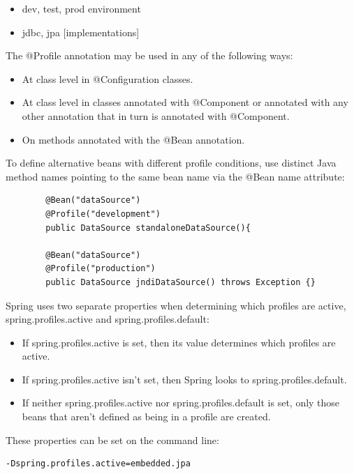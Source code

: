 \documentclass{scrartcl}
\begin{document}
     \begin{itemize}
        \item dev, test, prod environment
        \item jdbc, jpa [implementations]
    \end{itemize}

   The @Profile annotation may be used in any of the following ways:

   \begin{itemize}
       \item At class level in @Configuration classes.
       \item At class level in classes annotated with @Component or annotated with any other annotation that in turn is annotated with @Component.
       \item On methods annotated with the @Bean annotation.
   \end{itemize}

    To define alternative beans with different profile conditions, use distinct Java method names pointing to the same bean name via the @Bean name attribute:

    \begin{lstlisting}
        @Bean("dataSource")
        @Profile("development")
        public DataSource standaloneDataSource(){

        @Bean("dataSource")
        @Profile("production")
        public DataSource jndiDataSource() throws Exception {}

    \end{lstlisting}

   Spring uses two separate properties when determining which profiles are active, spring.profiles.active and spring.profiles.default:

    \begin{itemize}
       \item If spring.profiles.active is set,  then its value determines which profiles are active.
       \item If spring.profiles.active isn’t set, then Spring looks to spring.profiles.default.
       \item If neither spring.profiles.active nor spring.profiles.default is set, only those beans that aren’t defined as being in a profile are created.
    \end{itemize}

   These properties can be set on the command line:

   \begin{lstlisting}[language=bash]
       -Dspring.profiles.active=embedded.jpa
   \end{lstlisting}
\end{document}
